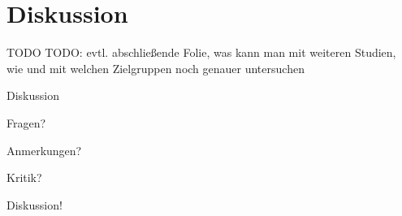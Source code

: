 \documentclass[]{beamer}
\begin{document}
\section{Diskussion}
\begin{frame}{TODO}
	TODO: evtl. abschließende Folie, was kann man mit weiteren Studien, wie und mit welchen Zielgruppen noch genauer untersuchen
\end{frame}

\begin{frame}{Diskussion}
  \begin{center}
	Fragen?

	Anmerkungen?
    
	Kritik?
    
	Diskussion!
	\end{center}
\end{frame}
\end{document}
